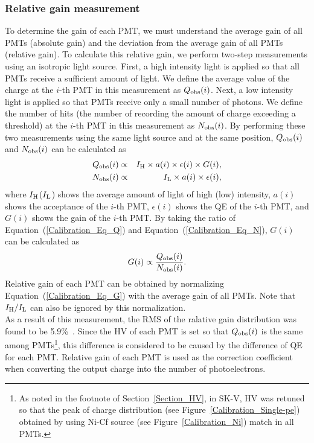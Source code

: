 \subsubsection{Relative gain measurement}
\vs\hs
To determine the gain of each PMT, we must understand the average gain of all PMTs (absolute gain) and the deviation from the average gain of all PMTs (relative gain).
To calculate this relative gain, we perform two-step measurements using an isotropic light source.
First, a high intensity light is applied so that all PMTs receive a sufficient amount of light.
We define the average value of the charge at the $i$-th PMT in this measurement as $Q_{\rm{obs}}(i)$.
Next, a low intensity light is applied so that PMTs receive only a small number of photons.
We define the number of hits (the number of recording the amount of charge exceeding a threshold) at the $i$-th PMT in this measurement as $N_{\rm{obs}}(i)$.
By performing these two measurements using the same light source and at the same position, $Q_{\rm{obs}}(i)$ and $N_{\rm{obs}}(i)$ can be calculated as
\begin{eqnarray}
	Q_{\rm{obs}}(i)&\propto&I_{\rm{H}} \times a(i) \times \epsilon(i) \times G(i),\label{Calibration_Eq_Q}\\
	N_{\rm{obs}}(i)&\propto&I_{\rm{L}} \times a(i) \times \epsilon(i),\label{Calibration_Eq_N}
\end{eqnarray}
where $I_{\rm{H}}$($I_{\rm{L}}$) shows the average amount of light of high (low) intensity, $a(i)$ shows the acceptance of the $i$-th PMT, $\epsilon(i)$ shows the QE of the $i$-th PMT, and $G(i)$ shows the gain of the $i$-th PMT.
By taking the ratio of Equation~(\ref{Calibration_Eq_Q}) and Equation~(\ref{Calibration_Eq_N}), $G(i)$ can be calculated as
\begin{eqnarray}
	G(i)\propto{Q_{\rm{obs}}(i) \over N_{\rm{obs}}(i)}.\label{Calibration_Eq_G}
\end{eqnarray}
Relative gain of each PMT can be obtained by normalizing Equation~(\ref{Calibration_Eq_G}) with the average gain of all PMTs.
Note that $I_{\rm{H}}/I_{\rm{L}}$ can also be ignored by this normalization.\\
\hs
As a result of this measurement, the RMS of the ralative gain distribution was found to be 5.9\%~\cite{2014AbeCalib}.
Since the HV of each PMT is set so that $Q_{\rm{obs}}(i)$ is the same among PMTs\footnote{As noted in the footnote of Section~\ref{Section_HV}, in SK-V, HV was retuned so that the peak of charge distribution (see Figure~\ref{Calibration_Single-pe}) obtained by using Ni-Cf source (see Figure~\ref{Calibration_Ni}) match in all PMTs.}, this difference is considered to be caused by the difference of QE for each PMT.
Relative gain of each PMT is used as the correction coefficient when converting the output charge into the number of photoelectrons.

